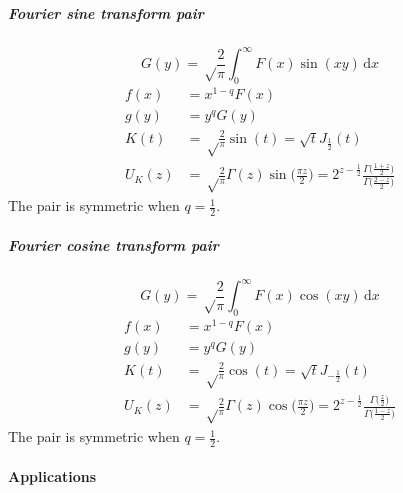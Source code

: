 \documentclass{article}
\renewcommand{\d}{\mathrm{d}}
\newcommand{\Mellin}{U}
\begin{document}
\subparagraph{Fourier sine transform pair}
\begin{equation}
    G(y) = \sqrt\frac2\pi \int_0^\infty F(x) \sin(xy) \,\d x
\end{equation}
\begin{align}
    f(x) &= x^{1-q} F(x) \\
    g(y) &= y^q G(y) \\
    K(t) &= \sqrt\frac2\pi \sin(t) = \sqrt t J_\frac12(t) \\
    \Mellin_K(z) &= \sqrt\frac2\pi \Gamma(z) \sin\bigl(\frac{\pi z}2\bigr)
    = 2^{z-\frac12} \frac{\Gamma\bigl(\frac{1+z}2\bigr)}{\Gamma\bigl(\frac{2-z}2\bigr)}
\end{align}
The pair is symmetric when $q=\frac12$.


\subparagraph{Fourier cosine transform pair}
\begin{equation}
    G(y) = \sqrt\frac2\pi \int_0^\infty F(x) \cos(xy) \,\d x
\end{equation}
\begin{align}
    f(x) &= x^{1-q} F(x) \\
    g(y) &= y^q G(y) \\
    K(t) &= \sqrt\frac2\pi \cos(t) = \sqrt t J_{-\frac12}(t) \\
    \Mellin_K(z) &= \sqrt\frac2\pi \Gamma(z) \cos\bigl(\frac{\pi z}2\bigr)
    = 2^{z-\frac12} \frac{\Gamma\bigl(\frac{z}2\bigr)}{\Gamma\bigl(\frac{1-z}2\bigr)}
\end{align}
The pair is symmetric when $q=\frac12$.


\paragraph{Applications}
\end{document}
